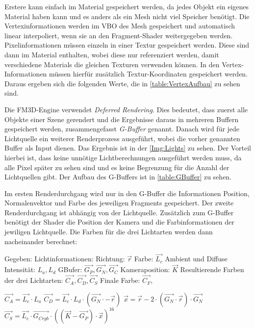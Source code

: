 Erstere kann einfach im Material gespeichert werden, da jedes Objekt ein eigenes Material haben kann und es anders als ein Mesh nicht viel Speicher benötigt. Die Vertexinformationen werden im \ac{VBO} des Mesh gespeichert und automatisch linear interpoliert, wenn sie an den Fragment-Shader weitergegeben werden. Pixelinformationen müssen einzeln in einer Textur gespeichert werden. Diese sind dann im Material enthalten, wobei diese nur referenziert werden, damit verschiedene Materials die gleichen Texturen verwenden können. In den Vertex-Informationen müssen hierfür zusätzlich Textur-Koordinaten gespeichert werden. Daraus ergeben sich die folgenden Werte, die in \cref{table:VertexAufbau} zu sehen sind.

Die FM3D-Engine verwendet \textit{Deferred Rendering}. Dies bedeutet, dass zuerst alle Objekte einer Szene gerendert und die Ergebnisse daraus in mehreren Buffern gespeichert werden, zusammengefasst \textit{G-Buffer} genannt. Danach wird für jede Lichtquelle ein weiterer Renderprozess ausgeführt, wobei die vorher genannten Buffer als Input dienen. Das Ergebnis ist in der \cref{Img:Lights} zu sehen. Der Vorteil hierbei ist, dass keine unnötige Lichtberechnungen ausgeführt werden muss, da alle Pixel später zu sehen sind und es keine Begrenzung für die Anzahl der Lichtquellen gibt. Der Aufbau des G-Buffers ist in \cref{table:GBuffer} zu sehen.

Im ersten Renderdurchgang wird nur in den G-Buffer die Informationen Position, Normalenvektor und Farbe des jeweiligen Fragments gespeichert. Der zweite Renderdurchgang ist abhängig von der Lichtquelle. Zusätzlich zum G-Buffer benötigt der Shader die Position der Kamera und die Farbinformationen der jewiligen Lichtquelle. Die Farben für die drei Lichtarten werden dann nacheinander berechnet:

Gegeben: \newline
	Lichtinformationen: Richtung: $\overrightarrow{r}$ Farbe: $\overrightarrow{L_{c}}$ Ambient und Diffuse Intensität: $L_{a}, L_{d}$ \newline
	GBufer: $\overrightarrow{G_{P}}, \overrightarrow{G_{N}}, \overrightarrow{G_{C}}$ \newline
	Kameraposition: $\overrightarrow{K}$ \newline
	Resultierende Farben der drei Lichtarten: $\overrightarrow{C_{A}},\overrightarrow{C_{D}},\overrightarrow{C_{S}}$\newline 
	Finale Farbe:  $\overrightarrow{C_{F}},$
	
	$\overrightarrow{C_{A}} = \overrightarrow{L_{c}} \cdot L_{a}$\newline
$\overrightarrow{C_{D}} = \overrightarrow{L_{c}} \cdot L_{d} \cdot (\overrightarrow{G_{N}} \cdot -\overrightarrow{r})$\newline
$\overrightarrow{x} = \overrightarrow{r} - 2 \cdot (\overrightarrow{G_{N}} \cdot \overrightarrow{r}) \cdot \overrightarrow{G_{N}}$\newline
$\overrightarrow{C_{S}} = \overrightarrow{L_{c}} \cdot \overrightarrow{G_{C rgb}} \cdot ((\overrightarrow{K} - \overrightarrow{G_{P}}) \cdot \overrightarrow{x})^{16}$
	

